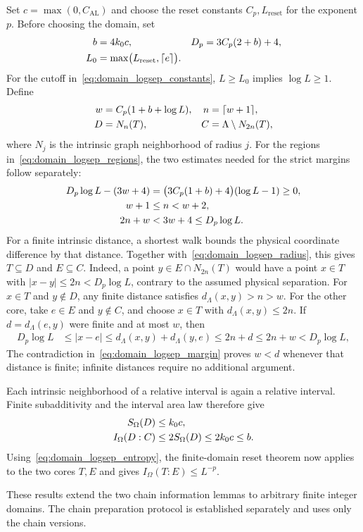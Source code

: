\documentclass{article}
\begin{document}
Set $c=\max(0,C_{\mathrm{AL}})$ and choose the reset constants
$C_p,L_{\mathrm{reset}}$ for the exponent $p$. Before choosing the domain, set
\begin{align}
    b &=4k_0c, & D_p&=3C_p(2+b)+4, \notag\\
    L_0&=\max\bigl(L_{\mathrm{reset}},\lceil e\rceil\bigr).
    \label{eq:domain_logsep_constants}
\end{align}
For the cutoff in~\eqref{eq:domain_logsep_constants}, $L\ge L_0$ implies
$\log L\ge1$. Define
\begin{align}
    w &=C_p(1+b+\log L), & n&=\lceil w+1\rceil, \notag\\
    D&=N_n(T), & C&=\Lambda\setminus N_{2n}(T),
    \label{eq:domain_logsep_regions}
\end{align}
where $N_j$ is the intrinsic graph neighborhood of radius $j$. For the
regions in~\eqref{eq:domain_logsep_regions}, the two estimates needed for
the strict margins follow separately:
\begin{align}
    D_p\log L-(3w+4)
    &=\bigl(3C_p(1+b)+4\bigr)(\log L-1)\ge0, \notag\\
    w+1&\le n<w+2, \notag\\
    2n+w&<3w+4\le D_p\log L.
    \label{eq:domain_logsep_radius}
\end{align}
For a finite intrinsic distance, a shortest walk bounds the physical coordinate
difference by that distance. Together with~\eqref{eq:domain_logsep_radius},
this gives $T\subseteq D$ and $E\subseteq C$.
Indeed, a point $y\in E\cap N_{2n}(T)$ would have a point $x\in T$ with
$|x-y|\le2n<D_p\log L$, contrary to the assumed physical separation.
For $x\in T$ and $y\notin D$, any finite distance satisfies
$d_\Lambda(x,y)>n>w$.
For the other core, take $e\in E$ and $y\notin C$, and choose $x\in T$ with
$d_\Lambda(x,y)\le2n$. If $d=d_\Lambda(e,y)$ were finite and at most $w$, then
\begin{align}
    D_p\log L&\le |x-e|
    \le d_\Lambda(x,y)+d_\Lambda(y,e)
    \le2n+d\le2n+w<D_p\log L,
    \label{eq:domain_logsep_margin}
\end{align}
The contradiction in~\eqref{eq:domain_logsep_margin} proves $w<d$ whenever
that distance is finite; infinite distances require no additional argument.

Each intrinsic neighborhood of a relative interval is again a relative
interval. Finite subadditivity and the interval area law therefore give
\begin{align}
    S_\Omega(D)&\le k_0c, \notag\\
    I_\Omega(D:C)&\le2S_\Omega(D)\le2k_0c\le b.
    \label{eq:domain_logsep_entropy}
\end{align}
Using~\eqref{eq:domain_logsep_entropy}, the finite-domain reset theorem now
applies to the two cores $T,E$ and gives
$I_\Omega(T:E)\le L^{-p}$.

These results extend the two chain information lemmas to arbitrary finite
 integer domains. The chain preparation protocol is established separately
 and uses only the chain versions.



\end{document}
